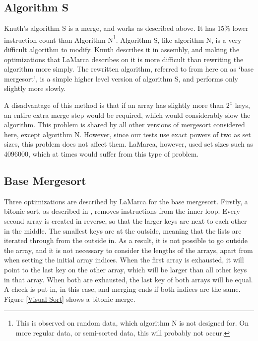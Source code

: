 \subsection{Algorithm S}

Knuth's algorithm S is a  merge, and works as described above. It has
15\% lower instruction count than Algorithm N\footnote{This is observed on
random data, which algorithm N is not designed for. On more regular data, or
semi-sorted data, this will probably not occur.}. Algorithm S, like algorithm N,
is a very difficult algorithm to modify. Knuth describes it in assembly, and
making the optimizations that LaMarca describes on it is more difficult than
rewriting the algorithm more simply. The rewritten algorithm, referred to from
here on as `base mergesort', is a simple higher level version of algorithm S,
and performs only slightly more slowly.

A disadvantage of this method is that if an array has slightly more than $2^x$
keys, an entire extra merge step would be required, which would considerably
slow the algorithm. This problem is shared by all other versions of mergesort
considered here, except algorithm N. However, since our tests use exact
powers of two as set sizes, this problem does not affect them. LaMarca,
however, used set sizes such as 4096000, which at times would suffer from this
type of problem.

\subsection{Base Mergesort}
\label{base mergesort}
Three optimizations are described by LaMarca for the base mergesort. Firstly, a
bitonic sort, as described in \cite{Sedgewick02}, removes instructions from the
inner loop. Every second array is created in reverse, so that the larger keys  
are next to each other in the middle. The smallest keys are at the outside,
meaning that the lists are iterated through from the outside in. As a result, it
is not possible to go outside the array, and it is not necessary to consider the
lengths of the arrays, apart from when setting the initial array indices. When
the first array is exhausted, it will point to the last key on the other array,
which will be larger than all other keys in that array. When both are
exhausted, the last key of both arrays will be equal. A check is put in, in this
case, and merging ends if both indices are the same. Figure \vref{Visual Sort}
shows a bitonic merge.

